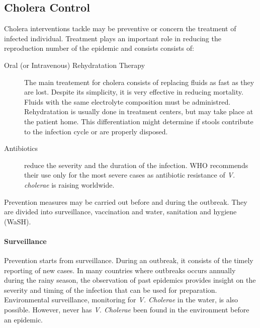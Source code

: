 \subsection{Cholera Control} 
Cholera interventions tackle may be preventive or concern the treatment of infected individual. Treatment plays an important role in reducing the reproduction number of the epidemic and consists consists of:
\begin{description}
\item[Oral (or Intravenous) Rehydratation Therapy] The main treatement for cholera consists of replacing fluids as fast as they are lost. Despite its simplicity, it is very effective in reducing mortality. Fluids with the same electrolyte composition must be administred\cite{Kuhn:GlucoseNotRiceBased:2014}.  Rehydratation is usually done in treatment centers, but may take place at the patient home. This differentiation might determine if stools contribute to the infection cycle or are properly disposed.
\item[Antibiotics] reduce the severity and the duration of the infection. WHO recommends their use only for the most severe cases as antibiotic resistance of \emph{V. cholerae} is raising worldwide\cite{Sack:GettingSeriousCholera:2006}.
\end{description}

Prevention measures may be carried out before and during the outbreak. They are divided into surveillance, vaccination and water, sanitation and hygiene (WaSH).

\paragraph{Surveillance} Prevention starts from surveillance. During an outbreak, it consists of the timely reporting of new cases. In many countries where outbreaks occurs annually during the rainy season, the observation of past epidemics provides insight on the severity and timing of the infection that can be used for preparation\cite{Baracchini:SeasonalityCholeraDynamics:2017}. Environmental surveillance, monitoring for \textit{V. Cholerae} in the water, is also possible. However, never has \textit{V. Cholerae} been found in the environment before an epidemic.

